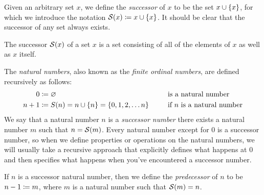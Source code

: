 \begin{definition}
    Given an arbitrary set \(x\), we define the \emph{successor} of \(x\) to be the set \(x \union \set*{x}\),
    for which we introduce the notation \(\successor{x} \defn x \union \set*{x}\).
    It should be clear that the successor of any set always exists.

    \begin{note}
        The successor \(\successor{x}\) of a set \(x\) is a set consisting of
        all of the elements of \(x\) as well as \(x\) itself.
    \end{note}
\end{definition}

\begin{definition}
    The \emph{natural numbers}, also known as the \emph{finite ordinal numbers},
    are defined recursively as follows:
    \begin{alignat*}{2}
        0 &\defn \emptyset &&\text{ is a natural number} \\
        n + 1 &\defn S(n)
               = n \union \set*{n}
               = \set{0, 1, 2, \dots n}~~~~&&\text{ if } n \text{ is a natural number}
    \end{alignat*}
    We say that a natural number \(n\) is a \emph{successor number}
    \iffbydefn there exists a natural number \(m\) such that \(n = \successor{m}\).
    Every natural number except for \(0\) is a successor number,
    so when we define properties or operations on the natural numbers,
    we will usually take a recursive approach that explicitly defines what happens at \(0\)
    and then specifies what happens when you've encountered a successor number.

    If \(n\) is a successor natural number,
    then we define the \emph{predecessor} of \(n\) to be \(n - 1 \coloneqq m\),
    where \(m\) is a natural number such that \(\successor{m} = n\).
\end{definition}

%     

